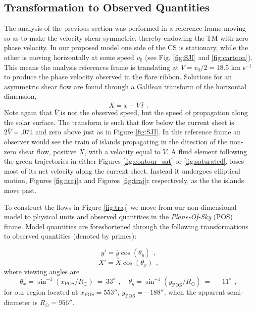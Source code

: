 \subsection{Transformation to Observed Quantities}

	The analysis of the previous section was performed in a reference frame moving so as to make the velocity shear symmetric, thereby endowing the TM with zero phase velocity.  In our proposed model one side of the CS is stationary, while the other is moving horizontally at some speed $v_0$ (see Fig. \ref{fig:SJI} and \ref{fig:cartoon}).  This means the analysis references frame is translating at $V=v_0/2=18.5$ km s$^{-1}$ to produce the phase velocity observed in the flare ribbon. Solutions for an asymmetric shear flow are found through a Galilean transform of the horizontal dimension,
	\begin{equation}
		\label{eqn:lorentz}
		\bar{X} = \bar{x} - \bar{V} \,\bar{t}~~.
	\end{equation}
Note again that $\bar{V}$ is not the observed speed, but the speed of propagation along the solar surface. The transform is such that flow below the current sheet is $2 \bar{V} = .074$ and zero above just as in Figure \ref{fig:SJI}. In this reference frame an observer would see the train of islands propagating in the direction of the non-zero shear flow, positive $\bar{X}$, with a velocity equal to $\bar{V}$. A fluid element following the green trajectories in either Figures \ref{fig:contour_sat} or \ref{fig:saturated}, loses most of its net velocity along the current sheet.  Instead it undergoes elliptical motion, Figures \ref{fig:traj}a and Figures \ref{fig:traj}c respectively, as the the islands move past. %

To construct the flows in Figure \ref{fig:traj} we move from our non-dimensional model to physical units and observed quantities in the \textit{Plane-Of-Sky} (POS) frame. Model quantities are foreshortened through the following transformations to observed quantities (denoted by primes):  
	
	\begin{equation}
		y' = \bar{y}\cos(\theta_y)~~, 
	\end{equation}
	\begin{equation}
		X' = \bar{X}\cos(\theta_x)~~,
	\end{equation}
where viewing angles are
	\begin{equation}
		\theta_x = \sin^{-1}(x_{\mathrm{POS}}/R_{\odot})~=~33^{\circ}~~,
		\quad \theta_y = \sin^{-1}(y_{\mathrm{POS}}/R_{\odot})~=~ -11^{\circ}~~,
        \end{equation}
for our region located at $x_{\mathrm{POS}}=553''$, $y_{\mathrm{POS}} = -188''$, when the apparent semi-diameter is $R_{\odot} = 956''$.

